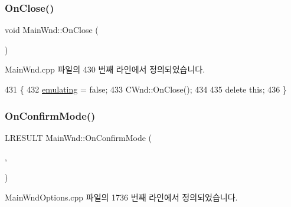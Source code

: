 \subsubsection{\texorpdfstring{On\+Close()}{OnClose()}}
{\footnotesize\ttfamily void Main\+Wnd\+::\+On\+Close (\begin{DoxyParamCaption}{ }\end{DoxyParamCaption})\hspace{0.3cm}{\ttfamily [protected]}}



Main\+Wnd.\+cpp 파일의 430 번째 라인에서 정의되었습니다.


\begin{DoxyCode}
431 \{
432   \mbox{\hyperlink{gb_globals_8h_af9cc36078b1b311753963297ae7f2a74}{emulating}} = \textcolor{keyword}{false};
433   CWnd::OnClose();
434 
435   \textcolor{keyword}{delete} \textcolor{keyword}{this};
436 \}
\end{DoxyCode}
\mbox{\label{class_main_wnd_a6e5d37a503b080743b30005e2d51e28d}} 
\subsubsection{\texorpdfstring{On\+Confirm\+Mode()}{OnConfirmMode()}}
{\footnotesize\ttfamily L\+R\+E\+S\+U\+LT Main\+Wnd\+::\+On\+Confirm\+Mode (\begin{DoxyParamCaption}\item[{W\+P\+A\+R\+AM}]{,  }\item[{L\+P\+A\+R\+AM}]{ }\end{DoxyParamCaption})}



Main\+Wnd\+Options.\+cpp 파일의 1736 번째 라인에서 정의되었습니다.


